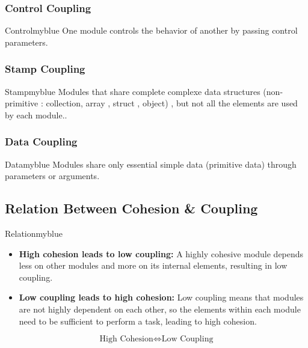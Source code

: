 \vspace{0.25cm}

\subsubsection{Control Coupling}
\begin{prettyBox}{Control}{myblue}
One module controls the behavior of another by passing control parameters.
\end{prettyBox}

\vspace{0.25cm}

\subsubsection{Stamp Coupling}
\begin{prettyBox}{Stamp}{myblue}
Modules that share complete complexe data structures (non-primitive : collection,
array , struct , object) , but not all the elements are used by each module..
\end{prettyBox}

\vspace{0.25cm}

\subsubsection{Data Coupling}
\begin{prettyBox}{Data}{myblue}
Modules share only essential simple data (primitive data) through parameters or arguments.
\end{prettyBox}

\vspace{0.5cm}

\subsection{Relation Between Cohesion \& Coupling}
\begin{prettyBox}{Relation}{myblue}
\begin{itemize}
    \item \textbf{High cohesion leads to low coupling:} A highly cohesive module depends less on other modules and more on its internal elements, resulting in low coupling.
    \item \textbf{Low coupling leads to high cohesion:} Low coupling means that modules are not highly dependent on each other, so the elements within each module need to be sufficient to perform a task, leading to high cohesion.
\end{itemize}

\[\boxed{\text{High Cohesion} \iff \text{Low Coupling}}\]
\end{prettyBox}

